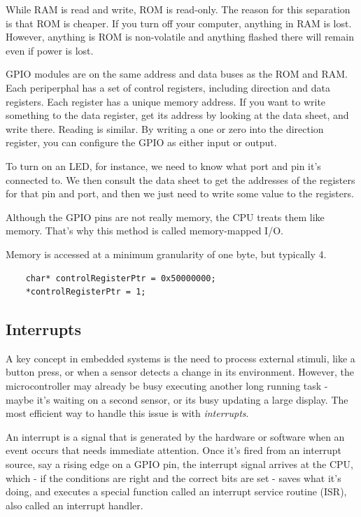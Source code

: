 While RAM is read and write, ROM is read-only. The reason for this separation
is that ROM is cheaper. If you turn off your computer, anything in RAM is lost.
However, anything is ROM is non-volatile and anything flashed there will remain
even if power is lost.

GPIO modules are on the same address and data buses as the ROM and RAM. Each
periperphal has a set of control registers, including direction and data registers.
Each register has a unique memory address. If you want to write something
to the data register, get its address by looking at the data sheet, and write
there. Reading is similar. By writing a one or zero into the direction register,
you can configure the GPIO as either input or output.

To turn on an LED, for instance, we need to know what port and pin it's connected
to. We then consult the data sheet to get the addresses of the registers for
that pin and port, and then we just need to write some value to the registers.

Although the GPIO pins are not really memory, the CPU treats them like memory.
That's why this method is called memory-mapped I/O.

Memory is accessed at a minimum granularity of one byte, but typically 4.

\begin{lstlisting}
    char* controlRegisterPtr = 0x50000000;
    *controlRegisterPtr = 1;
\end{lstlisting}

\subsection{Interrupts}
A key concept in embedded systems is the need to process external stimuli,
like a button press, or when a sensor detects a change in its environment.
However, the microcontroller may already be busy executing another long
running task - maybe it's waiting on a second sensor, or its busy updating
a large display. The most efficient way to handle this issue is with
\emph{interrupts}.

An interrupt is a signal that is generated by the hardware or software
when an event occurs that needs immediate attention. Once it's fired
from an interrupt source, say a rising edge on a GPIO pin, the
interrupt signal arrives at the CPU, which - if the conditions are right
and the correct bits are set - saves what it's doing, and executes a
special function called an interrupt service routine (ISR), also called
an interrupt handler.

